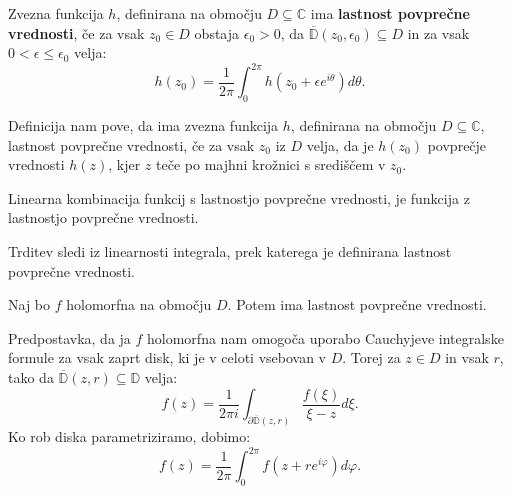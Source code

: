 \documentclass[mat1]{fmfdelo}
\newcommand{\C}{\mathbb C}
\begin{document}
    \begin{definicija}
        Zvezna funkcija $h$, definirana na območju $D \subseteq \C$ ima \textbf{lastnost povprečne vrednosti}, če za vsak $z_0 \in D$ obstaja $\epsilon_0 > 0$, da $\overline{\mathbb{D}}(z_0, \epsilon_0) \subseteq D$ in za vsak $0 < \epsilon \leq \epsilon_0 $ velja:
        $$
            h(z_0) = \frac{1}{2 \pi} \int_{0}^{2 \pi}{h(z_0 + \epsilon e^{i \theta}) d\theta}.
        $$
    \end{definicija}
    \begin{opomba}
        Definicija nam pove, da ima zvezna funkcija $h$, definirana na območju $D \subseteq \C$, lastnost povprečne vrednosti, če za vsak $z_0$ iz $D$ velja, 
        da je $h(z_0)$ povprečje vrednosti $h(z)$, kjer $z$ teče po majhni krožnici s središčem v $z_0$.
    \end{opomba}
    \begin{trditev}
        \label{linlpv}
        Linearna kombinacija funkcij s lastnostjo povprečne vrednosti, je funkcija z lastnostjo povprečne vrednosti. 
    \end{trditev}
    \begin{dokaz}
        Trditev sledi iz linearnosti integrala, prek katerega je definirana lastnost povprečne vrednosti.
    \end{dokaz}

    \begin{trditev}
        Naj bo $f$ holomorfna na območju $D$. Potem ima lastnost povprečne vrednosti.
    \end{trditev}
    \begin{dokaz}
        Predpostavka, da ja $f$ holomorfna nam omogoča uporabo Cauchyjeve integralske formule za vsak zaprt disk, ki je v celoti vsebovan v $D$. Torej za $z \in D$ in vsak $r$, tako da $\overline{\mathbb{D}}(z,r) \subseteq \mathbb{D}$ velja:
        $$
        f(z) = \frac{1}{2 \pi i} \int_{\partial \overline{\mathbb{D}}(z, r)}{\frac{f(\xi)}{\xi  - z}}d\xi.
        $$
        Ko rob diska parametriziramo, dobimo:
        $$
        f(z) = \frac{1}{2 \pi} \int_{0}^{2\pi}{f(z + re^{i\varphi})}d\varphi.
        $$
    \end{dokaz}
\end{document}
